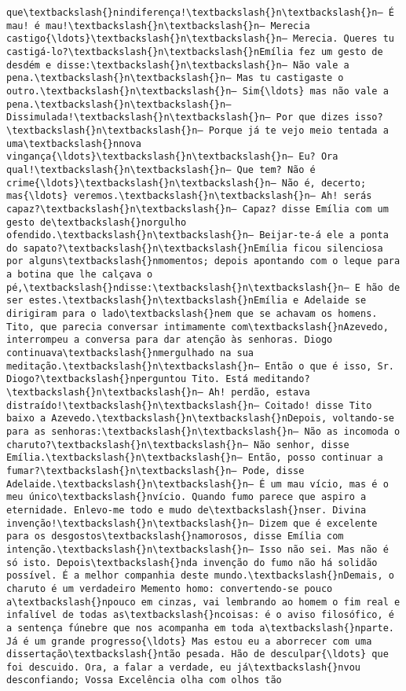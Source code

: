 \documentclass[11pt]{article}
\begin{document}
\begin{Verbatim}[commandchars=\\\{\}]
que\textbackslash{}nindiferença!\textbackslash{}n\textbackslash{}n— É mau! é mau!\textbackslash{}n\textbackslash{}n— Merecia castigo{\ldots}\textbackslash{}n\textbackslash{}n— Merecia. Queres tu castigá-lo?\textbackslash{}n\textbackslash{}nEmília fez um gesto de desdém e disse:\textbackslash{}n\textbackslash{}n— Não vale a pena.\textbackslash{}n\textbackslash{}n— Mas tu castigaste o outro.\textbackslash{}n\textbackslash{}n— Sim{\ldots} mas não vale a pena.\textbackslash{}n\textbackslash{}n— Dissimulada!\textbackslash{}n\textbackslash{}n— Por que dizes isso?\textbackslash{}n\textbackslash{}n— Porque já te vejo meio tentada a uma\textbackslash{}nnova vingança{\ldots}\textbackslash{}n\textbackslash{}n— Eu? Ora qual!\textbackslash{}n\textbackslash{}n— Que tem? Não é crime{\ldots}\textbackslash{}n\textbackslash{}n— Não é, decerto; mas{\ldots} veremos.\textbackslash{}n\textbackslash{}n— Ah! serás capaz?\textbackslash{}n\textbackslash{}n— Capaz? disse Emília com um gesto de\textbackslash{}norgulho ofendido.\textbackslash{}n\textbackslash{}n— Beijar-te-á ele a ponta do sapato?\textbackslash{}n\textbackslash{}nEmília ficou silenciosa por alguns\textbackslash{}nmomentos; depois apontando com o leque para a botina que lhe calçava o pé,\textbackslash{}ndisse:\textbackslash{}n\textbackslash{}n— E hão de ser estes.\textbackslash{}n\textbackslash{}nEmília e Adelaide se dirigiram para o lado\textbackslash{}nem que se achavam os homens. Tito, que parecia conversar intimamente com\textbackslash{}nAzevedo, interrompeu a conversa para dar atenção às senhoras. Diogo continuava\textbackslash{}nmergulhado na sua meditação.\textbackslash{}n\textbackslash{}n— Então o que é isso, Sr. Diogo?\textbackslash{}nperguntou Tito. Está meditando?\textbackslash{}n\textbackslash{}n— Ah! perdão, estava distraído!\textbackslash{}n\textbackslash{}n— Coitado! disse Tito baixo a Azevedo.\textbackslash{}n\textbackslash{}nDepois, voltando-se para as senhoras:\textbackslash{}n\textbackslash{}n— Não as incomoda o charuto?\textbackslash{}n\textbackslash{}n— Não senhor, disse Emília.\textbackslash{}n\textbackslash{}n— Então, posso continuar a fumar?\textbackslash{}n\textbackslash{}n— Pode, disse Adelaide.\textbackslash{}n\textbackslash{}n— É um mau vício, mas é o meu único\textbackslash{}nvício. Quando fumo parece que aspiro a eternidade. Enlevo-me todo e mudo de\textbackslash{}nser. Divina invenção!\textbackslash{}n\textbackslash{}n— Dizem que é excelente para os desgostos\textbackslash{}namorosos, disse Emília com intenção.\textbackslash{}n\textbackslash{}n— Isso não sei. Mas não é só isto. Depois\textbackslash{}nda invenção do fumo não há solidão possível. É a melhor companhia deste mundo.\textbackslash{}nDemais, o charuto é um verdadeiro Memento homo: convertendo-se pouco a\textbackslash{}npouco em cinzas, vai lembrando ao homem o fim real e infalível de todas as\textbackslash{}ncoisas: é o aviso filosófico, é a sentença fúnebre que nos acompanha em toda a\textbackslash{}nparte. Já é um grande progresso{\ldots} Mas estou eu a aborrecer com uma dissertação\textbackslash{}ntão pesada. Hão de desculpar{\ldots} que foi descuido. Ora, a falar a verdade, eu já\textbackslash{}nvou desconfiando; Vossa Excelência olha com olhos tão 
\end{Verbatim}
\end{document}
